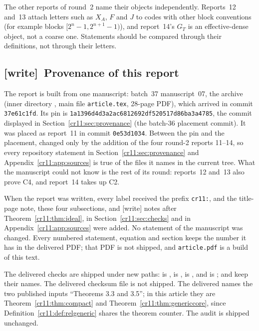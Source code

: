 \documentclass[11pt,letterpaper]{article}
\theoremstyle{plain}
\theoremstyle{definition}
\theoremstyle{remark}
\numberwithin{equation}{section}
\newcommand{\wtag}{\textup{[write]}}
\begin{document}
The other reports of round~2 name their objects independently. Reports~12
and~13 attach letters such as $X_A$, $F$ and $J$ to codes with other block
conventions (for example blocks $[2^n-1,2^{n+1}-1)$), and report~14's
$G_T$ is an effective-dense object, not a coarse one. Statements should be
compared through their definitions, not through their letters.

\subsection{\wtag\ Provenance of this report}\label{cr11:sec:wprov}

The report is built from one manuscript: batch~37 manuscript~07, the
archive  (inner directory
, main file \texttt{article.tex},
28-page PDF), which arrived in commit \texttt{37e61c1fd}. Its pin is
\texttt{1a1396d4d3a2ac6812692df520517d86ba3a4785}, the commit displayed in
Section~\ref{cr11:sec:provenance} (the batch-36 placement commit). It was
placed as report~11 in commit \texttt{0e53d1034}. Between the pin and the
placement,  changed only by the addition
of the four round-2 reports 11--14, so every repository statement in
Section~\ref{cr11:sec:provenance} and Appendix~\ref{cr11:app:sources} is
true of the files it names in the current tree. What the manuscript could
not know is the rest of its round: reports~12 and~13 also prove C4, and
report~14 takes up C2.

When the report was written, every label received the prefix
\texttt{cr11:}, and the title-page note, these four subsections, and
\wtag{} notes after Theorem~\ref{cr11:thm:ideal}, in
Section~\ref{cr11:sec:checks} and in Appendix~\ref{cr11:app:sources} were
added. No statement of the manuscript was changed. Every numbered
statement, equation and section keeps the number it has in the delivered
PDF; that PDF is not shipped, and \texttt{article.pdf} is a build of this
text.

The delivered checks are shipped under new paths:
 is ,
 is ,
 is , and
 is ;  and
 keep their names. The delivered checksum file is not
shipped. The delivered  names the two published inputs
``Theorems 3.3 and 3.5''; in this article they are Theorem~\ref{cr11:thm:compact}
and Theorem~\ref{cr11:thm:genericcore}, since Definition~\ref{cr11:def:relgeneric} shares the
theorem counter. The audit is shipped unchanged.
\end{document}
